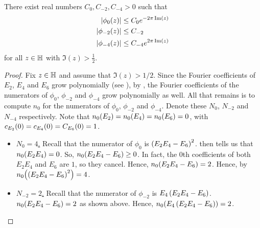 \begin{boxlemma}\label{Ch4:Lemma:PolyFourierCoeffBound_Apply_a}
    There exist real numbers $C_0, C_{-2}, C_{-4} > 0$ such that
    \begin{align}
        \left\lvert \phi_0\!\left( z \right) \right\rvert &\leq C_{0} e^{-2\pi\operatorname{Im}(z)}  
            \label{Ch4:Eq:PolyFourierCoeffBound_phi_0} \\
        \left\lvert \phi_{-2}\!\left( z \right) \right\rvert &\leq C_{-2}  
            \label{Ch4:Eq:PolyFourierCoeffBound_phi_neg_2} \\
        \left\lvert \phi_{-4}\!\left( z \right) \right\rvert &\leq C_{-4} e^{2\pi\operatorname{Im}(z)}
            \label{Ch4:Eq:PolyFourierCoeffBound_phi_neg_4}
    \end{align}
    for all $z \in \mathbb{H}$ with $\Im(z) > \frac{1}{2}$.
\end{boxlemma}
\begin{proof}
    Fix $z \in \mathbb{H}$ and assume that $\Im(z) > 1/2$. Since the Fourier coefficients of $E_2$, $E_4$ and $E_6$ grow polynomially (see ), by , the Fourier coefficients of the numerators of $\phi_0$, $\phi_{-2}$ and $\phi_{-4}$ grow polynomially as well. All that remains is to compute $n_0$ for the numerators of $\phi_0$, $\phi_{-2}$ and $\phi_{-4}$. Denote these $N_0$, $N_{-2}$ and $N_{-4}$ respectively. Note that $n_0\!\left( E_2 \right) = n_0\!\left( E_4 \right) = n_0\!\left( E_6 \right) = 0$, with $c_{E_2}\!\left( 0 \right) = c_{E_4}\!\left( 0 \right) = C_{E_6}\!\left( 0 \right) = 1$.

    \begin{itemize}
        \item \underline{$N_0 = 4$.} Recall that the numerator of $\phi_0$ is $\left( E_2 E_4 - E_6 \right)^2$.  then tells us that $n_0\!\left( E_2 E_4 \right) = 0$. So, $n_0\!\left( E_2 E_4 - E_6 \right) \geq 0$. In fact, the $0$th coefficients of both $E_2 E_4$ and $E_6$ are $1$, so they cancel. Hence, $n_0\!\left( E_2 E_4 - E_6 \right) = 2$. Hence, by $n_0\!\left( \left( E_2 E_4 - E_6 \right)^2 \right) = 4$.
        
        \item \underline{$N_{-2} = 2$.} Recall that the numerator of $\phi_{-2}$ is $E_4\left( E_2 E_4 - E_6 \right)$. $n_0\!\left( E_2 E_4 - E_6 \right) = 2$ as shown above. Hence, $n_0\!\left( E_4\left( E_2 E_4 - E_6 \right) \right) = 2$.
        

\end{itemize}
\end{proof}

